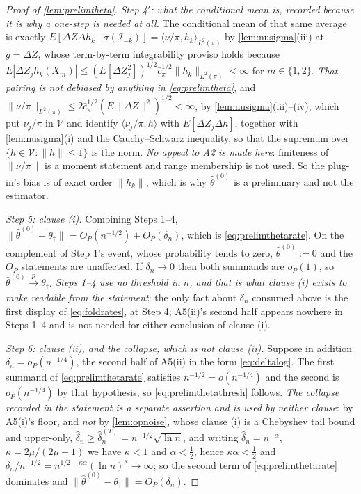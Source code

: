 \begin{proof}[Proof of \cref{lem:prelimtheta}]
\emph{Step 4$'$: what the conditional mean is, recorded because it is why a one-step is needed at all.} The
conditional mean of that same average is exactly
$E[\Delta Z\Delta h_k\mid\sigma(\mathcal I_{-k})]=\langle\nu/\pi,h_k\rangle_{L^{2}(\pi)}$ by \cref{lem:nusigma}(iii) at
$g=\Delta Z$, whose term-by-term integrability proviso holds because
$E|\Delta Z_jh_k(X_m)|\le(E[\Delta Z_j^{2}])^{1/2}\bar c_\pi^{1/2}\|h_k\|_{L^{2}(\pi)}<\infty$ for
$m\in\{1,2\}$. \emph{That pairing is not debiased by anything in \eqref{eq:prelimtheta}}, and
$\|\nu/\pi\|_{L^{2}(\pi)}\le2\bar c_\pi^{1/2}(E\|\Delta Z\|^{2})^{1/2}<\infty$, by
\cref{lem:nusigma}(iii)--(iv), which put $\nu_j/\pi$ in $\mathcal V$ and identify
$\langle\nu_j/\pi,h\rangle$ with $E[\Delta Z_j\Delta h]$, together with \cref{lem:nusigma}(i) and the
Cauchy--Schwarz inequality, so that the supremum over $\{h\in\mathcal V:\|h\|\le1\}$ is the norm. \emph{No
appeal to A2 is made here}: finiteness of $\|\nu/\pi\|$ is a moment statement and range membership is not
used. So the plug-in's bias is of exact order $\|h_k\|$, which is why $\hat\theta^{(0)}$ is a preliminary
and not the estimator.

\emph{Step 5: clause \textup{(i)}.} Combining Steps 1--4,
$\|\hat\theta^{(0)}-\theta_\dagger\|=O_P(n^{-1/2})+O_P(\delta_n)$, which is \eqref{eq:prelimthetarate}. On
the complement of Step 1's event, whose probability tends to zero, $\hat\theta^{(0)}:=0$ and the $O_P$
statements are unaffected. If $\delta_n\to0$ then both summands are $o_P(1)$, so
$\hat\theta^{(0)}\xrightarrow{p}\theta_\dagger$. \emph{Steps 1--4 use no threshold in $n$, and that is what
clause \textup{(i)} exists to make readable from the statement}: the only fact about $\delta_n$ consumed
above is the first display of \eqref{eq:foldrates}, at Step 4; A5(ii)'s second half appears nowhere in Steps
1--4 and is not needed for either conclusion of clause \textup{(i)}.

\emph{Step 6: clause \textup{(ii)}, and the collapse, which is not clause \textup{(ii)}.} Suppose in
addition $\delta_n=o_P(n^{-1/4})$, the second half of A5(ii) in the form \eqref{eq:deltalog}. The first
summand of \eqref{eq:prelimthetarate} satisfies $n^{-1/2}=o(n^{-1/4})$ and the second is $o_P(n^{-1/4})$ by
that hypothesis, so \eqref{eq:prelimthetathresh} follows. \emph{The collapse recorded in the statement is a
separate assertion and is used by neither clause}: by A5(i)'s floor, and \emph{not} by
\cref{lem:opnoise}, whose clause \textup{(i)} is a Chebyshev tail bound and upper-only, 
$\hat\delta_n\ge\hat\delta_n^{(T)}=n^{-1/2}\sqrt{\ln n}$, and writing
$\hat\delta_n=n^{-\alpha}$, $\kappa=2\mu/(2\mu+1)$ we have $\kappa<1$ and $\alpha<\tfrac12$, hence
$\kappa\alpha<\tfrac12$ and $\delta_n/n^{-1/2}=n^{1/2-\kappa\alpha}(\ln n)^{\kappa}\to\infty$; so the second
term of \eqref{eq:prelimthetarate} dominates and $\|\hat\theta^{(0)}-\theta_\dagger\|=O_P(\delta_n)$.
\end{proof}

